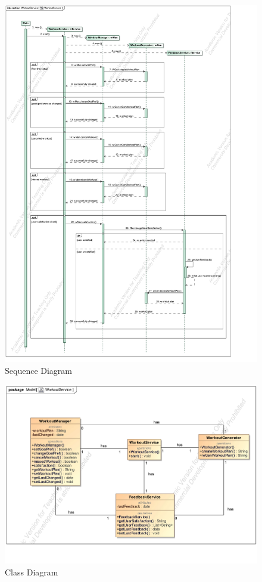 \documentclass{article}
\begin{document}
		\begin{figure}[h!]
			\centering
			\captionsetup{labelformat=empty}
			\caption{Sequence Diagram}
		    	\includegraphics[scale=0.75, angle=0]{Marc/workout/WorkoutServiceSequence.pdf}
		\end{figure}
		\clearpage
		\begin{figure}[h!]
			\centering
			\captionsetup{labelformat=empty}
			\caption{Class Diagram}
		    	\includegraphics[width=\textwidth, angle=0]{Marc/workout/WorkoutServiceClass.pdf}
		\end{figure}
		\clearpage
\end{document}
